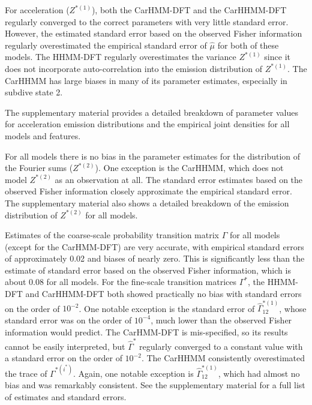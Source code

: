 For acceleration ($Z^{*(1)}$), both the CarHMM-DFT and the CarHHMM-DFT regularly converged to the correct parameters with very little standard error. However, the estimated standard error based on the observed Fisher information regularly overestimated the empirical standard error of $\hat \mu$ for both of these models. 
The HHMM-DFT regularly overestimates the variance $Z^{*(1)}$ since it does not incorporate auto-correlation into the emission distribution of $Z^{*(1)}$. The CarHHMM has large biases in many of its parameter estimates, especially in subdive state 2. 

The supplementary material provides a detailed breakdown of parameter values for acceleration emission distributions and the empirical joint densities for all models and features.

For all models there is no bias in the parameter estimates for the distribution of the Fourier sums ($Z^{*(2)}$). One exception is the CarHHMM, which does not model $Z^{*(2)}$ as an observation at all. The standard error estimates based on the observed Fisher information closely approximate the empirical standard error.
The supplementary material also shows a detailed breakdown of the emission distribution of $Z^{*(2)}$ for all models.

Estimates of the coarse-scale probability transition matrix $\Gamma$ for all models (except for the CarHMM-DFT) are very accurate, with empirical standard errors of approximately 0.02 and biases of nearly zero. This is significantly less than the estimate of standard error based on the observed Fisher information, which is about 0.08 for all models.
For the fine-scale transition matrices $\Gamma^*$, the HHMM-DFT and CarHHMM-DFT both showed practically no bias with standard errors on the order of $10^{-2}$. One notable exception is the standard error of $\hat \Gamma^{*(1)}_{12}$, whose standard error was on the order of $10^{-4}$, much lower than the observed Fisher information would predict. The CarHMM-DFT is mis-specified, so its results cannot be easily interpreted, but $\hat \Gamma^*$ regularly converged to a constant value with a standard error on the order of $10^{-2}$. The CarHHMM consistently overestimated the trace of $\Gamma^{*(i^*)}$. Again, one notable exception is $\hat \Gamma^{*(1)}_{12}$, which had almost no bias and was remarkably consistent. See the supplementary material for a full list of estimates and standard errors.

\fi